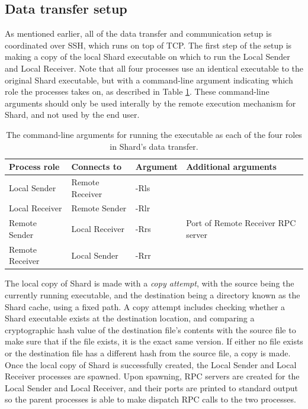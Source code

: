 \documentclass[twoside]{report}
\begin{document}
\subsection{Data transfer setup}

As mentioned earlier, all of the data transfer and communication setup is coordinated over SSH, which runs on top of TCP.
The first step of the setup is making a copy of the local Shard executable on which to run the Local Sender and Local Receiver.
Note that all four processes use an identical executable to the original Shard executable, but with a command-line argument indicating which role the processes takes on, as described in Table \ref{fig:process_role_args}.
These command-line arguments should only be used interally by the remote execution mechanism for Shard, and not used by the end user.

\begin{table}[h]
  \begin{center}
    \begin{tabular}{|l|l|l|l|}
      \hline
      Process role    & Connects to     & Argument & Additional arguments               \\ \hline
      Local Sender    & Remote Receiver & -Rls     &                                    \\ \hline
      Local Receiver  & Remote Sender   & -Rlr     &                                    \\ \hline
      Remote Sender   & Local Receiver  & -Rrs     & Port of Remote Receiver RPC server \\ \hline
      Remote Receiver & Local Sender    & -Rrr     &                                    \\ \hline
    \end{tabular}
    \caption{The command-line arguments for running the executable as each of the four roles in Shard's data transfer.}
    \label{fig:process_role_args}
  \end{center}
\end{table}


The local copy of Shard is made with a \textit{copy attempt}, with the source being the currently running executable, and the destination being a directory known as the Shard cache, using a fixed path.
A copy attempt includes checking whether a Shard executable exists at the destination location, and comparing a cryptographic hash value of the destination file's contents with the source file to make sure that if the file exists, it is the exact same version.
If either no file exists or the destination file has a different hash from the source file, a copy is made.
Once the local copy of Shard is successfully created, the Local Sender and Local Receiver processes are spawned.
Upon spawning, RPC servers are created for the Local Sender and Local Receiver, and their ports are printed to standard output so the parent processes is able to make dispatch RPC calls to the two processes.
\end{document}
